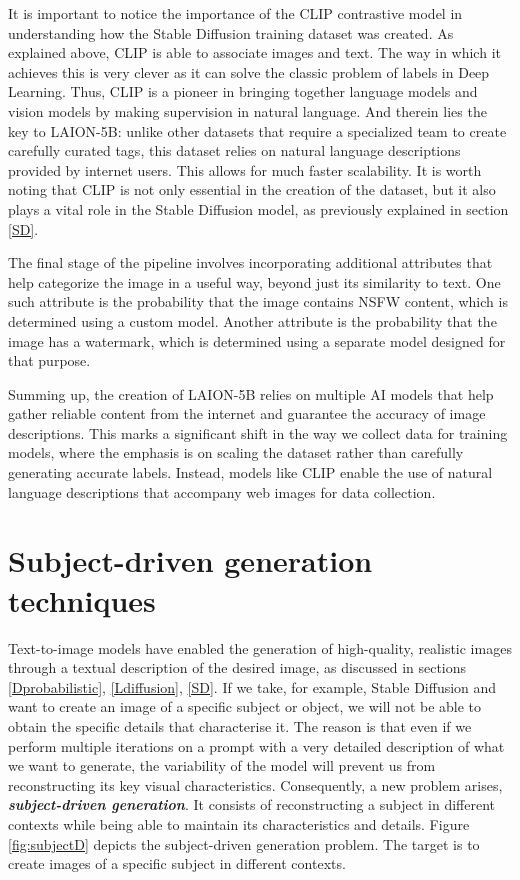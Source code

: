 It is important to notice the importance of the CLIP contrastive model in understanding how the Stable Diffusion training dataset was created. As explained above, CLIP is able to associate images and text. The way in which it achieves this is very clever as it can solve the classic problem of labels in Deep Learning. Thus, CLIP is a pioneer in bringing together language models and vision models by making supervision in natural language. And therein lies the key to LAION-5B: unlike other datasets that require a specialized team to create carefully curated tags, this dataset relies on natural language descriptions provided by internet users. This allows for much faster scalability. It is worth noting that CLIP is not only essential in the creation of the dataset, but it also plays a vital role in the Stable Diffusion model, as previously explained in section \ref{SD}.

The final stage of the pipeline involves incorporating additional attributes that help categorize the image in a useful way, beyond just its similarity to text. One such attribute is the probability that the image contains NSFW content, which is determined using a custom model. Another attribute is the probability that the image has a watermark, which is determined using a separate model designed for that purpose.

Summing up, the creation of LAION-5B relies on multiple AI models that help gather reliable content from the internet and guarantee the accuracy of image descriptions. This marks a significant shift in the way we collect data for training models, where the emphasis is on scaling the dataset rather than carefully generating accurate labels. Instead, models like CLIP enable the use of natural language descriptions that accompany web images for data collection.

\section{Subject-driven generation techniques}

Text-to-image models have enabled the generation of high-quality, realistic images through a textual description of the desired image, as discussed in sections \ref{Dprobabilistic}, \ref{Ldiffusion}, \ref{SD}. If we take, for example, Stable Diffusion and want to create an image of a specific subject or object, we will not be able to obtain the specific details that characterise it. The reason is that even if we perform multiple iterations on a prompt with a very detailed description of what we want to generate, the variability of the model will prevent us from reconstructing its key visual characteristics. Consequently, a new problem arises, \textit{\textbf{subject-driven generation}}. It consists of reconstructing a subject in different contexts while being able to maintain its characteristics and details. Figure \ref{fig:subjectD} depicts the subject-driven generation problem. The target is to create images of a specific subject in different contexts.

